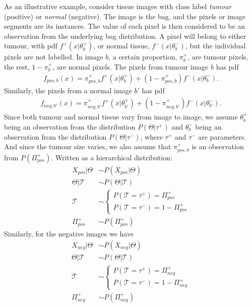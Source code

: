 As an illustrative example, consider tissue images with class label {\it tumour} (positive) or {\it normal} (negative). 
The image is the bag, and the pixels or image segments are its instances. 
The value of each pixel is then considered to be an observation from the underlying bag distribution. 
A pixel will belong to either tumour, with pdf $f^+(x|\theta_b^+)$, or normal tissue, $f^-(x|\theta_b^-)$, but the individual pixels are not labelled. 
In image $b$, a certain proportion,  $\pi^+_b$,  are tumour pixels, the rest, $1-\pi^+_b$, are normal pixels.  
The pixels from tumour image $b$ has pdf
\begin{align}
  f_{pos,b}(x) = \pi^+_{pos,b} f^+(x|\theta_b^+) + (1-\pi^+_{pos,b})f^-(x|\theta_b^-).
\end{align}
Similarly, the pixels from a normal image $b'$ has pdf
\begin{align}
  f_{neg,b'}(x) = \pi^+_{neg,b'} f^+(x|\theta_{b'}^+) + (1-\pi^+_{neg,b'})f^-(x|\theta_{b'}^-).
\end{align}
Since both tumour and normal tissue vary from image to image, we assume $\theta_b^+$ being an observation from the distribution $P(\Theta|\tau^+)$ and $\theta_b^-$ being an observation from the distribution $P(\Theta|\tau^-)$, where $\tau^+$ and $\tau^-$ are parameters. 
And since the tumour size varies, we also assume that $\pi^+_{pos,b}$ is an observation from $P(\Pi^+_{pos})$. 
Written as a hierarchical distribution: 
\begin{align}
  X_{pos}|\Theta & \sim P(X_{pos} | \Theta) \\
  \Theta|\mathcal{T} &  \sim P(\Theta|\mathcal{T}) \\
  \mathcal{T} & \sim \begin{cases}
    P(\mathcal{T} = \tau^+) = \Pi_{pos}^+\\
    P(\mathcal{T} = \tau^-)  = 1-\Pi_{pos}^+
  \end{cases} \\
  \Pi_{pos}^+ & \sim P(\Pi^+_{pos})
\end{align}
Similarly, for the negative images we have
\begin{align}
  X_{neg}|\Theta & \sim P(X_{neg} | \Theta) \\
  \Theta|\mathcal{T} &  \sim P(\Theta|\mathcal{T}) \\
  \mathcal{T} & \sim \begin{cases}
    P(\mathcal{T} = \tau^+) = \Pi_{neg}^+\\
    P(\mathcal{T} = \tau^-)  = 1-\Pi_{neg}^+
  \end{cases} \\
  \Pi_{neg}^+ & \sim P(\Pi^+_{neg})
\end{align}


